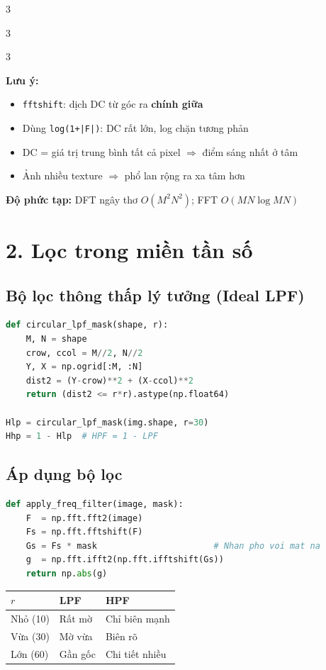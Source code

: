 \documentclass[9pt,landscape,a4paper]{extarticle}
\begin{document}
\begin{multicols*}{3}
\begin{multicols*}{3}
\begin{multicols}{3}
\begin{notebox}
\textbf{Lưu ý:}
\begin{itemize}
  \item \texttt{fftshift}: dịch DC từ góc ra \textbf{chính giữa}
  \item Dùng \texttt{log(1+|F|)}: DC rất lớn, log chặn tương phản
  \item DC = giá trị trung bình tất cả pixel $\Rightarrow$ điểm sáng nhất ở tâm
  \item Ảnh nhiều texture $\Rightarrow$ phổ lan rộng ra xa tâm hơn
\end{itemize}
\end{notebox}

\textbf{Độ phức tạp:} DFT ngây thơ $O(M^2N^2)$; FFT $O(MN\log MN)$

\section{2. Lọc trong miền tần số}

\subsection{Bộ lọc thông thấp lý tưởng (Ideal LPF)}
\begin{lstlisting}[language=Python]
def circular_lpf_mask(shape, r):
    M, N = shape
    crow, ccol = M//2, N//2
    Y, X = np.ogrid[:M, :N]
    dist2 = (Y-crow)**2 + (X-ccol)**2
    return (dist2 <= r*r).astype(np.float64)

Hlp = circular_lpf_mask(img.shape, r=30)
Hhp = 1 - Hlp  # HPF = 1 - LPF
\end{lstlisting}

\subsection{Áp dụng bộ lọc}
\begin{lstlisting}[language=Python]
def apply_freq_filter(image, mask):
    F  = np.fft.fft2(image)
    Fs = np.fft.fftshift(F)
    Gs = Fs * mask                       # Nhan pho voi mat na
    g  = np.fft.ifft2(np.fft.ifftshift(Gs))
    return np.abs(g)
\end{lstlisting}

\begin{center}\small
\begin{tabular}{@{}lll@{}}
\toprule
$r$ & LPF & HPF \\
\midrule
Nhỏ (10) & Rất mờ & Chỉ biên mạnh \\
Vừa (30) & Mờ vừa & Biên rõ \\
Lớn (60) & Gần gốc & Chi tiết nhiều \\
\bottomrule
\end{tabular}
\end{center}


\end{multicols}
\end{multicols*}
\end{multicols*}
\end{document}
